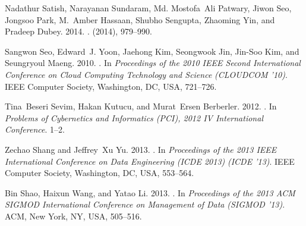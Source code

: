 \documentclass[reprint,twocolumn,showpacs,preprintnumbers,amsmath, aps,pre,amssymb]{revtex4-1}
\begin{document}
\begin{thebibliography}{00}
{
{Nadathur Satish}, {Narayanan Sundaram}, {Md. Mostofa~Ali Patwary}, {Jiwon
  Seo}, {Jongsoo Park}, {M.~Amber Hassaan}, {Shubho Sengupta}, {Zhaoming Yin},
  {and} {Pradeep Dubey}. 2014.
\newblock {}.
\newblock  (2014), 979--990.
\newblock
{}


{Sangwon Seo}, {Edward~J. Yoon}, {Jaehong Kim}, {Seongwook Jin}, {Jin-Soo Kim},
  {and} {Seungryoul Maeng}. 2010.
\newblock {}. In {\em Proceedings of the 2010 IEEE Second
  International Conference on Cloud Computing Technology and Science} {\em
  (CLOUDCOM '10)}. IEEE Computer Society, Washington, DC, USA, 721--726.
\newblock
{}


{Tina~Beseri Sevim}, {Hakan Kutucu}, {and} {Murat~Ersen Berberler}. 2012.
\newblock {}. In {\em Problems of Cybernetics and Informatics (PCI), 2012 IV
  International Conference}. 1--2.
\newblock
{}


{Zechao Shang} {and} {Jeffrey~Xu Yu}. 2013.
\newblock {}.
  In {\em Proceedings of the 2013 IEEE International Conference on Data
  Engineering (ICDE 2013)} {\em (ICDE '13)}. IEEE Computer Society, Washington,
  DC, USA, 553--564.
\newblock
{}


{Bin Shao}, {Haixun Wang}, {and} {Yatao Li}. 2013.
\newblock {}. In {\em Proceedings of the 2013 ACM SIGMOD International Conference
  on Management of Data} {\em (SIGMOD '13)}. ACM, New York, NY, USA, 505--516.
\newblock
{}


}
\end{thebibliography}
\end{document}
